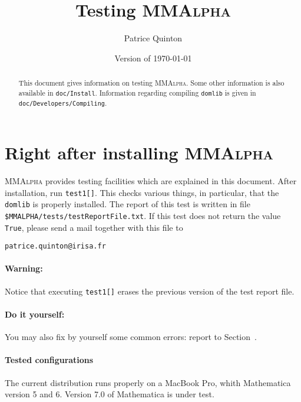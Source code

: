 \documentclass[12pt]{article}
\begin{document}
\newcommand{\domlib}{{\sc domlib}}
\newcommand{\ML}{{\sc Mathlink}}
\newcommand{\mprep}{{\sc mprep}}
\newcommand{\polylib}{{\sc polylib}}
\newcommand{\mma}{{\sc Mathematica}}
\newcommand{\mkf}{{\texttt Makefile}}
\newcommand{\gcc}{\texttt{gcc}}
\newcommand{\doml}{\texttt{domlib.c}}
\newcommand{\tm}{\texttt{domlibtm.c}}
\newcommand{\mmAlpha}{\textsc{MMAlpha}}
\newcommand{\MMAlpha}{\textsc{MMAlpha}}
\newcommand{\MMA}{\textsc{Mathematica}}
\newcommand{\true}{\texttt{True}}
\newcommand{\false}{\texttt{False}}

\title{Testing \mmAlpha{}}
\author{Patrice Quinton}
\date{Version of \today}
\maketitle

\begin{abstract}
This document gives information on testing \mmAlpha{}. Some other information 
is also available in \texttt{doc/Install}. Information regarding compiling \texttt{domlib}
is given in \texttt{doc/Developers/Compiling}.
\end{abstract}
\section{Right after installing \mmAlpha{}}
\mmAlpha{} provides testing facilities which are explained in this document. 
After installation, run \texttt{test1[]}. This checks various things, in particular, that 
the \texttt{domlib} is properly installed. 
The report of this test is written in file \texttt{\$MMALPHA/tests/testReportFile.txt}. 
If this test does not return the value \texttt{True}, please send a mail together
with this file to 
\begin{verbatim}
patrice.quinton@irisa.fr
\end{verbatim}

\paragraph{Warning:} Notice that executing \texttt{test1[]} erases the previous version of the test 
report file.

\paragraph{Do it yourself:} You may also fix by yourself some common errors: report to Section~\label{troubleshooting}.

\paragraph{Tested configurations}
The current distribution runs properly on a MacBook Pro, whith \mma{} version 5 and 6. 
Version 7.0 of \mma{} is under test.
\end{document}
